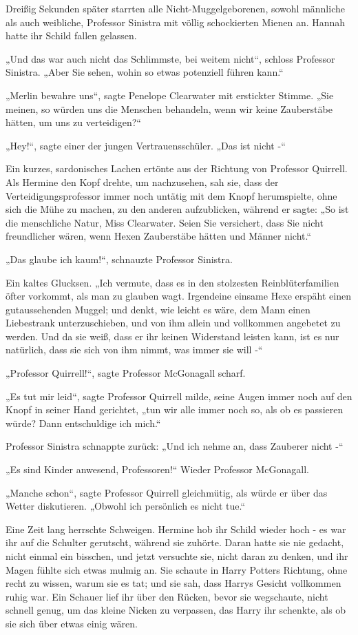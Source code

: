 {Dreißig Sekunden später starrten alle Nicht-Muggelgeborenen, sowohl männliche als auch weibliche, Professor Sinistra mit völlig schockierten Mienen an. Hannah hatte ihr Schild fallen gelassen.

„Und das war auch nicht das Schlimmste, bei weitem nicht“, schloss Professor Sinistra. „Aber Sie sehen, wohin so etwas potenziell führen kann.“

„Merlin bewahre uns“, sagte Penelope Clearwater mit erstickter Stimme. „Sie meinen, so würden uns die Menschen behandeln, wenn wir keine Zauberstäbe hätten, um uns zu verteidigen?“

„Hey!“, sagte einer der jungen Vertrauensschüler. „Das ist nicht -“

Ein kurzes, sardonisches Lachen ertönte aus der Richtung von Professor Quirrell. Als Hermine den Kopf drehte, um nachzusehen, sah sie, dass der Verteidigungsprofessor immer noch untätig mit dem Knopf herumspielte, ohne sich die Mühe zu machen, zu den anderen aufzublicken, während er sagte: „So ist die menschliche Natur, Miss Clearwater. Seien Sie versichert, dass Sie nicht freundlicher wären, wenn Hexen Zauberstäbe hätten und Männer nicht.“

„Das glaube ich kaum!“, schnauzte Professor Sinistra.

Ein kaltes Glucksen. „Ich vermute, dass es in den stolzesten Reinblüterfamilien öfter vorkommt, als man zu glauben wagt. Irgendeine einsame Hexe erspäht einen gutaussehenden Muggel; und denkt, wie leicht es wäre, dem Mann einen Liebestrank unterzuschieben, und von ihm allein und vollkommen angebetet zu werden. Und da sie weiß, dass er ihr keinen Widerstand leisten kann, ist es nur natürlich, dass sie sich von ihm nimmt, was immer sie will -“

„Professor Quirrell!“, sagte Professor McGonagall scharf.

„Es tut mir leid“, sagte Professor Quirrell milde, seine Augen immer noch auf den Knopf in seiner Hand gerichtet, „tun wir alle immer noch so, als ob es passieren würde? Dann entschuldige ich mich.“

Professor Sinistra schnappte zurück: „Und ich nehme an, dass Zauberer nicht -“

„Es sind Kinder anwesend, Professoren!“ Wieder Professor McGonagall.

„Manche schon“, sagte Professor Quirrell gleichmütig, als würde er über das Wetter diskutieren. „Obwohl ich persönlich es nicht tue.“

Eine Zeit lang herrschte Schweigen. Hermine hob ihr Schild wieder hoch - es war ihr auf die Schulter gerutscht, während sie zuhörte. Daran hatte sie nie gedacht, nicht einmal ein bisschen, und jetzt versuchte sie, nicht daran zu denken, und ihr Magen fühlte sich etwas mulmig an. Sie schaute in Harry Potters Richtung, ohne recht zu wissen, warum sie es tat; und sie sah, dass Harrys Gesicht vollkommen ruhig war. Ein Schauer lief ihr über den Rücken, bevor sie wegschaute, nicht schnell genug, um das kleine Nicken zu verpassen, das Harry ihr schenkte, als ob sie sich über etwas einig wären.

}
